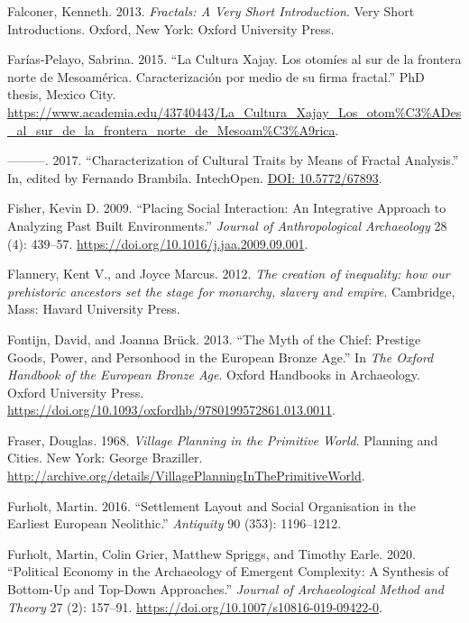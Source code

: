 \documentclass[
  12pt,
  a4paper, twoside]{book}
\newlength{\cslhangindent}
\newlength{\cslentryspacingunit} %
\newenvironment{CSLReferences}[2] %
 {%
  \setlength{\parindent}{0pt}
  \ifodd #1
  \let\oldpar\par
  \def\par{\hangindent=\cslhangindent\oldpar}
  \fi
  \setlength{\parskip}{#2\cslentryspacingunit}
 }%
 {}
\begin{document}
\begin{CSLReferences}{1}{0}
\leavevmode{}%
Falconer, Kenneth. 2013. \emph{Fractals: A Very Short Introduction}. Very Short Introductions. Oxford, New York: Oxford University Press.

\leavevmode{}%
Farías-Pelayo, Sabrina. 2015. {``La Cultura Xajay. Los otomíes al sur de la frontera norte de Mesoamérica. Caracterización por medio de su firma fractal.''} PhD thesis, Mexico City. \url{https://www.academia.edu/43740443/La_Cultura_Xajay_Los_otom\%C3\%ADes_al_sur_de_la_frontera_norte_de_Mesoam\%C3\%A9rica}.

\leavevmode{}%
---------. 2017. {``Characterization of Cultural Traits by Means of Fractal Analysis.''} In, edited by Fernando Brambila. IntechOpen. \href{https://DOI:\%2010.5772/67893}{DOI: 10.5772/67893}.

\leavevmode{}%
Fisher, Kevin D. 2009. {``Placing Social Interaction: An Integrative Approach to Analyzing Past Built Environments.''} \emph{Journal of Anthropological Archaeology} 28 (4): 439--57. \url{https://doi.org/10.1016/j.jaa.2009.09.001}.

\leavevmode{}%
Flannery, Kent V., and Joyce Marcus. 2012. \emph{The creation of inequality: how our prehistoric ancestors set the stage for monarchy, slavery and empire}. Cambridge, Mass: Havard University Press.

\leavevmode{}%
Fontijn, David, and Joanna Brück. 2013. {``The {Myth} of the {Chief}: {Prestige Goods}, {Power}, and {Personhood} in the {European Bronze Age}.''} In \emph{The {Oxford Handbook} of the {European Bronze Age}}. Oxford {Handbooks} in {Archaeology}. {Oxford University Press}. \url{https://doi.org/10.1093/oxfordhb/9780199572861.013.0011}.

\leavevmode{}%
Fraser, Douglas. 1968. \emph{Village Planning in the Primitive World}. Planning and Cities. New York: George Braziller. \url{http://archive.org/details/VillagePlanningInThePrimitiveWorld}.

\leavevmode{}%
Furholt, Martin. 2016. {``Settlement Layout and Social Organisation in the Earliest European Neolithic.''} \emph{Antiquity} 90 (353): 1196--1212.

\leavevmode{}%
Furholt, Martin, Colin Grier, Matthew Spriggs, and Timothy Earle. 2020. {``Political Economy in the Archaeology of Emergent Complexity: A Synthesis of Bottom-Up and Top-Down Approaches.''} \emph{Journal of Archaeological Method and Theory} 27 (2): 157--91. \url{https://doi.org/10.1007/s10816-019-09422-0}.


\end{CSLReferences}
\end{document}

